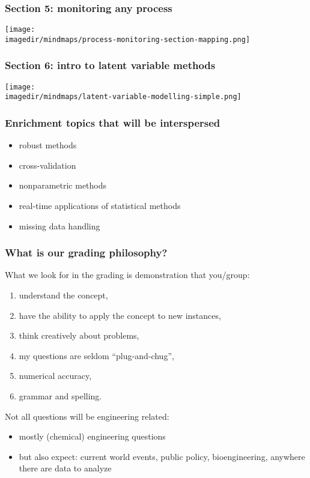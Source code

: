 \begin{frame}\frametitle{Section 5: monitoring any process}
	\texttt{[image: \\imagedir/mindmaps/process-monitoring-section-mapping.png]}
\end{frame}

\begin{frame}\frametitle{Section 6: intro to latent variable methods}

	\texttt{[image: \\imagedir/mindmaps/latent-variable-modelling-simple.png]}
\end{frame}

\begin{frame}\frametitle{Enrichment topics that will be interspersed}
	\begin{itemize}
		\item	robust methods
		\item	cross-validation
		\item	nonparametric methods
		\item	real-time applications of statistical methods
		\item	missing data handling
	\end{itemize}
\end{frame}

\begin{frame}\frametitle{What is our grading philosophy?}
	What we look for in the grading is demonstration that you/group:
	\begin{enumerate}
		\item	understand the concept,
		\item	have the ability to apply the concept to new instances,
		\item	think creatively about problems,
		\item	my questions are seldom ``plug-and-chug'',
		\item	numerical accuracy,
		\item	grammar and spelling.
	\end{enumerate}

	\vspace{12pt}
	Not all questions will be engineering related:
	\begin{itemize}
		\item	mostly (chemical) engineering questions
		\item	but also expect: current world events, public policy, bioengineering, anywhere there are data to analyze
	\end{itemize}
\end{frame}

